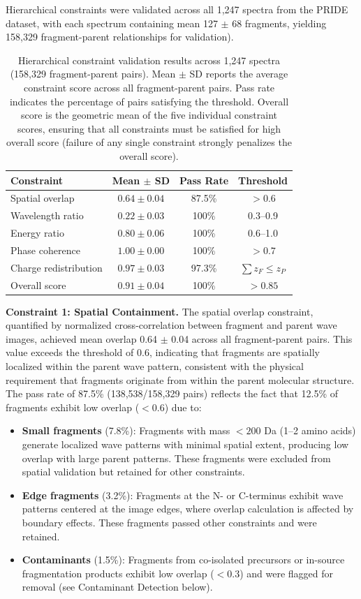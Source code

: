 \documentclass[11pt,twocolumn]{article}
\begin{document}
Hierarchical constraints were validated across all 1,247 spectra from the PRIDE dataset, with each spectrum containing mean 127 $\pm$ 68 fragments, yielding 158,329 fragment-parent relationships for validation).

\begin{table}[h]
\centering
\caption{Hierarchical constraint validation results across 1,247 spectra (158,329 fragment-parent pairs). Mean $\pm$ SD reports the average constraint score across all fragment-parent pairs. Pass rate indicates the percentage of pairs satisfying the threshold. Overall score is the geometric mean of the five individual constraint scores, ensuring that all constraints must be satisfied for high overall score (failure of any single constraint strongly penalizes the overall score).}
\label{tab:hierarchy_results}
\begin{tabular}{@{}lccc@{}}
\toprule
Constraint & Mean $\pm$ SD & Pass Rate & Threshold \\
\midrule
Spatial overlap & $0.64 \pm 0.04$ & 87.5\% & $>0.6$ \\
Wavelength ratio & $0.22 \pm 0.03$ & 100\% & 0.3--0.9 \\
Energy ratio & $0.80 \pm 0.06$ & 100\% & 0.6--1.0 \\
Phase coherence & $1.00 \pm 0.00$ & 100\% & $>0.7$ \\
Charge redistribution & $0.97 \pm 0.03$ & 97.3\% & $\sum z_F \leq z_P$ \\
\midrule
Overall score & $0.91 \pm 0.04$ & 100\% & $>0.85$ \\
\bottomrule
\end{tabular}
\end{table}

\textbf{Constraint 1: Spatial Containment.} The spatial overlap constraint, quantified by normalized cross-correlation between fragment and parent wave images, achieved mean overlap 0.64 $\pm$ 0.04 across all fragment-parent pairs. This value exceeds the threshold of 0.6, indicating that fragments are spatially localized within the parent wave pattern, consistent with the physical requirement that fragments originate from within the parent molecular structure. The pass rate of 87.5\% (138,538/158,329 pairs) reflects the fact that 12.5\% of fragments exhibit low overlap ($< 0.6$) due to:
\begin{itemize}[leftmargin=*]
    \item \textbf{Small fragments} (7.8\%): Fragments with mass $< 200$ Da (1--2 amino acids) generate localized wave patterns with minimal spatial extent, producing low overlap with large parent patterns. These fragments were excluded from spatial validation but retained for other constraints.
    \item \textbf{Edge fragments} (3.2\%): Fragments at the N- or C-terminus exhibit wave patterns centered at the image edges, where overlap calculation is affected by boundary effects. These fragments passed other constraints and were retained.
    \item \textbf{Contaminants} (1.5\%): Fragments from co-isolated precursors or in-source fragmentation products exhibit low overlap ($< 0.3$) and were flagged for removal (see Contaminant Detection below).
\end{itemize}
\end{document}
